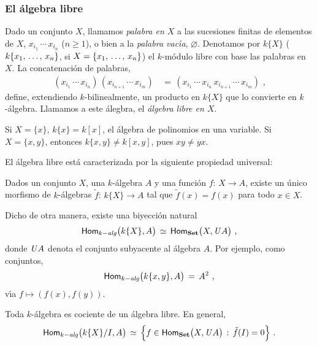 \subsubsection{El \'{a}lgebra libre}

Dado un conjunto $X$, llamamos \emph{palabra en $X$} a las sucesiones finitas
de elementos de $X$, $x_{i_1}\,\cdots\,x_{i_n}$ ($n\geq 1$), o bien a la
\emph{palabra vac\'{\i}a}, $\varnothing$. Denotamos por $k\{X\}$
($k\{\lista{x}{n}\}$, si $X=\{\lista{x}{n}\}$) el $k$-m\'{o}dulo libre con base
las palabras en $X$. La concatenaci\'{o}n de palabras,
\begin{align*}
	(x_{i_1}\,\cdots\,x_{i_n})\,(x_{i_{n+1}}\,\cdots\,x_{i_m}) & \,=\,
		(x_{i_1}\,\cdots\,x_{i_n}\,x_{i_{n+1}}\,\cdots\,x_{i_m})
	\text{ ,}
\end{align*}
%
define, extendiendo $k$-bilinealmente, un producto en $k\{X\}$ que lo convierte
en $k$-\'{a}lgebra. Llamamos a este \'{a}legbra, el \emph{\'{a}lgebra libre %
en $X$}.

\begin{ejemploLibre}\label{ejemplo:libre}
	Si $X=\{x\}$, $k\{x\}=k[x]$, el \'{a}lgebra de polinomios en una
	variable. Si $X=\{x,y\}$, entonces $k\{x,y\}\not=k[x,y]$, pues
	$xy\not=yx$.
\end{ejemploLibre}

El \'{a}lgebra libre est\'{a} caracterizada por la siguiente propiedad
universal:

\begin{propoLibre}\label{propo:libre}
	Dados un conjunto $X$, una $k$-\'{a}lgebra $A$ y una funci\'{o}n
	$f:\,X\rightarrow A$, existe un \'{u}nico morfismo de $k$-\'{a}lgebras
	$\tilde f:\,k\{X\}\rightarrow A$ tal que $\tilde f(x)=f(x)$ para todo
	$x\in X$.
\end{propoLibre}

Dicho de otra manera, existe una biyecci\'{o}n natural
\begin{equation}
	\label{eq:propo:libre}
	\Homalg\big(k\{X\},A\big) \,\simeq\,\Hom[\Set]\big(X,\olvido A\big)
	\text{ ,}
\end{equation}
%
donde $\mathit{U} A$ denota el conjunto subyacente al \'{a}lgebra $A$. Por
ejemplo, como conjuntos,
\begin{align*}
	\mathsf{Hom}_{k-\mathit{alg}}\big(k\{x,y\},A\big) \,=\,A^2
	\text{ ,}
\end{align*}
%
v\'{\i}a $f\mapsto (f(x),f(y))$.

Toda $k$-\'{a}lgebra es cociente de un \'{a}lgebra libre. En general,
\begin{equation}
\label{eq:libre:cociente}
	\Homalg\big(k\{X\}/I,A\big) \,\simeq\,
		\Big\{f\in\Hom[\Set]\big(X,\olvido A\big)\,:\,
			\tilde f(I)=0\Big\}
	\text{ .}
\end{equation}
%

